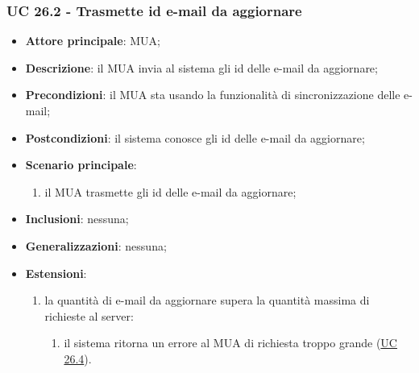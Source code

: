     \subsubsection{UC 26.2 - Trasmette id e-mail da aggiornare} \label{sec:UC26.2}
    \begin{itemize}
        \item \textbf{Attore principale}: MUA;
        \item \textbf{Descrizione}: il MUA invia al sistema gli id delle e-mail da aggiornare;
        \item \textbf{Precondizioni}: il MUA sta usando la funzionalità di sincronizzazione delle e-mail;
        \item \textbf{Postcondizioni}: il sistema conosce gli id delle e-mail da aggiornare;
        \item \textbf{Scenario principale}:
            \begin{enumerate}
                \item il MUA trasmette gli id delle e-mail da aggiornare;
            \end{enumerate}
        \item \textbf{Inclusioni}: nessuna;
        \item \textbf{Generalizzazioni}: nessuna;
        \item \textbf{Estensioni}:
            \begin{enumerate}[label=\alph*.]
                \item la quantità di e-mail da aggiornare supera la quantità massima di richieste al server:
                \begin{enumerate}[label=\arabic*.]
                    \item il sistema ritorna un errore al MUA di richiesta troppo grande (\hyperref[sec:UC26.4]{UC 26.4}).
                \end{enumerate}
            \end{enumerate}
    \end{itemize}


